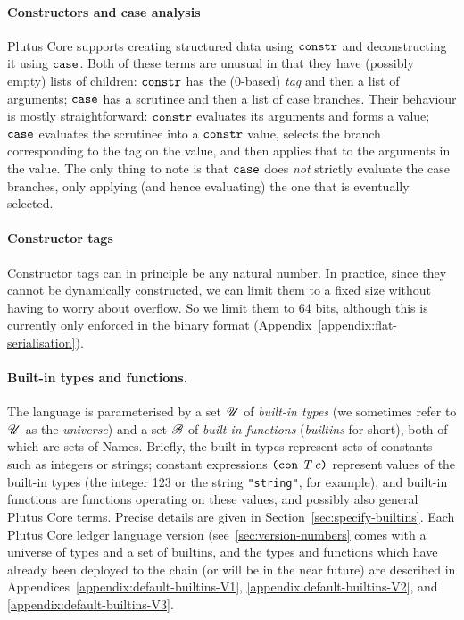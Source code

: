\paragraph{Constructors and case analysis}
Plutus Core supports creating structured data using $\texttt{constr}$ and deconstructing
it using $\texttt{case}$. Both of these terms are unusual in that they have (possibly
empty) lists of children: $\texttt{constr}$ has the (0-based) \emph{tag} and then a list of arguments;
$\texttt{case}$ has a scrutinee and then a list of case branches. Their behaviour is mostly
straightforward: $\texttt{constr}$ evaluates its arguments and forms a value; $\texttt{case}$
evaluates the scrutinee into a $\texttt{constr}$ value, selects the branch corresponding to
the tag on the value, and then applies that to the arguments in the value. The only thing
to note is that $\texttt{case}$ does \emph{not} strictly evaluate the case branches, only
applying (and hence evaluating) the one that is eventually selected.

\paragraph{Constructor tags}
Constructor tags can in principle be any natural number. In practice, since they cannot
be dynamically constructed, we can limit them to a fixed size without having to worry
about overflow. So we limit them to 64 bits, although this is currently only enforced in
the binary format (Appendix~\ref{appendix:flat-serialisation}).

\paragraph{Built-in types and functions.} The language is parameterised by a set $\mathscr{U}$ of
\textit{built-in types} (we sometimes refer to $\mathscr{U}$ as the \textit{universe})
and a set $\mathscr{B}$ of \textit{built-in functions} (\textit{builtins} for short),
both of which are sets of Names.  Briefly, the built-in types represent sets of
constants such as integers or strings; constant expressions $\texttt{(} \texttt{con} ~ \textit{T} ~ c \texttt{)}$
represent values of the built-in types (the integer 123 or the string
\texttt{"string"}, for example), and built-in functions are functions operating
on these values, and possibly also general Plutus Core terms.  Precise details
are given in Section~\ref{sec:specify-builtins}.  Each Plutus Core ledger
language version (see~\ref{sec:version-numbers} comes with a universe of types
and a set of builtins, and the types and functions which have already been
deployed to the chain (or will be in the near future) are described in
Appendices~\ref{appendix:default-builtins-V1},
\ref{appendix:default-builtins-V2}, and \ref{appendix:default-builtins-V3}.%

